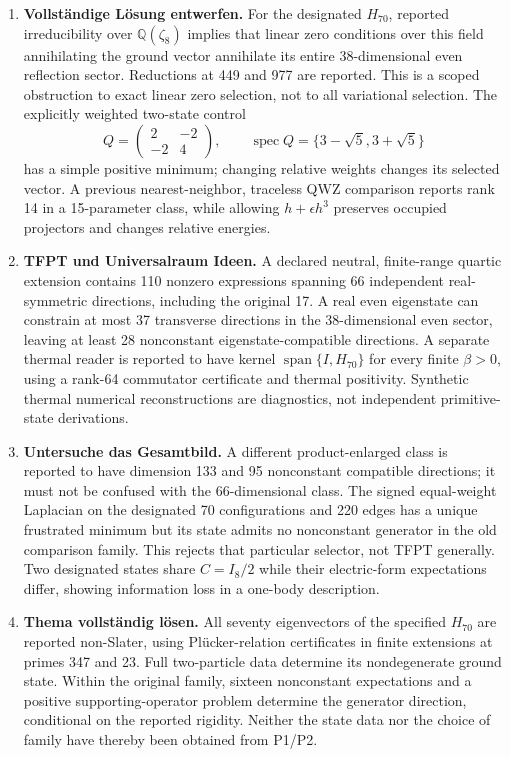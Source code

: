 \begin{enumerate}[leftmargin=*]
\item \textbf{Vollst\"andige L\"osung entwerfen.}
For the designated $H_{70}$, reported irreducibility over
$\mathbb Q(\zeta_8)$ implies that linear zero conditions over this field
annihilating the ground vector annihilate its entire 38-dimensional even
reflection sector. Reductions at 449 and 977 are reported. This is a scoped
obstruction to exact linear zero selection, not to all variational
selection. The explicitly weighted two-state control
\[
 Q=\begin{pmatrix}2&-2\\-2&4\end{pmatrix},\qquad
 \operatorname{spec}Q=\{3-\sqrt5,3+\sqrt5\}
\]
has a simple positive minimum; changing relative weights changes its
selected vector. A previous nearest-neighbor, traceless QWZ comparison
reports rank 14 in a 15-parameter class, while allowing $h+\epsilon h^3$
preserves occupied projectors and changes relative energies.

\item \textbf{TFPT und Universalraum Ideen.}
A declared neutral, finite-range quartic extension contains 110 nonzero
expressions spanning 66 independent real-symmetric directions, including
the original 17. A real even eigenstate can constrain at most 37 transverse
directions in the 38-dimensional even sector, leaving at least 28
nonconstant eigenstate-compatible directions. A separate thermal reader
is reported to have kernel $\operatorname{span}\{I,H_{70}\}$ for every
finite $\beta>0$, using a rank-64 commutator certificate and thermal
positivity. Synthetic thermal numerical reconstructions are diagnostics,
not independent primitive-state derivations.

\item \textbf{Untersuche das Gesamtbild.}
A different product-enlarged class is reported to have dimension 133 and
95 nonconstant compatible directions; it must not be confused with the
66-dimensional class. The signed equal-weight Laplacian on the designated
70 configurations and 220 edges has a unique frustrated minimum but its
state admits no nonconstant generator in the old comparison family.
This rejects that particular selector, not TFPT generally. Two designated
states share $C=I_8/2$ while their electric-form expectations differ,
showing information loss in a one-body description.

\item \textbf{Thema vollst\"andig l\"osen.}
All seventy eigenvectors of the specified $H_{70}$ are reported non-Slater,
using Pl\"ucker-relation certificates in finite extensions at primes 347
and 23. Full two-particle data determine its nondegenerate ground state.
Within the original family, sixteen nonconstant expectations and a
positive supporting-operator problem determine the generator direction,
conditional on the reported rigidity. Neither the state data nor the
choice of family have thereby been obtained from P1/P2.
\end{enumerate}

